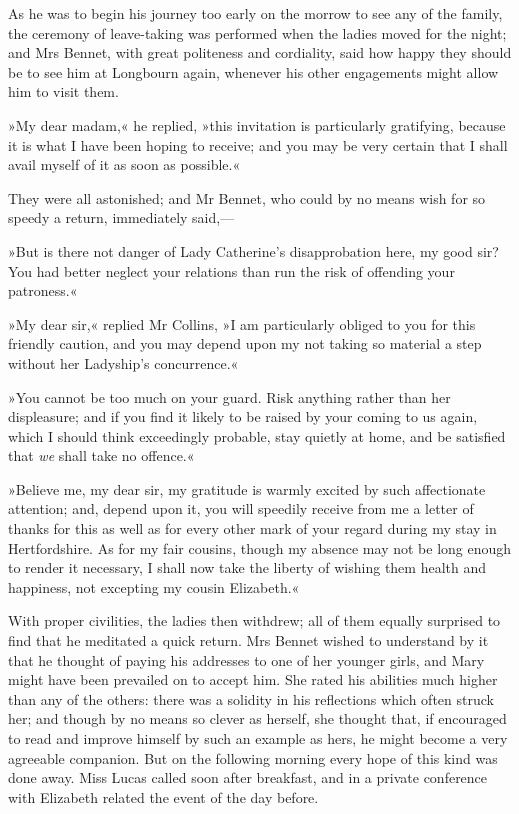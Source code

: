 As he was to begin his journey too early on the morrow to see any of the family, the ceremony of leave-taking was performed when the ladies moved for the night; and Mrs Bennet, with great politeness and cordiality, said how happy they should be to see him at Longbourn again, whenever his other engagements might allow him to visit them.

»My dear madam,« he replied, »this invitation is particularly gratifying, because it is what I have been hoping to receive; and you may be very certain that I shall avail myself of it as soon as possible.«

They were all astonished; and Mr Bennet, who could by no means wish for so speedy a return, immediately said,—

»But is there not danger of Lady Catherine's disapprobation here, my good sir? You had better neglect your relations than run the risk of offending your patroness.«

»My dear sir,« replied Mr Collins, »I am particularly obliged to you for this friendly caution, and you may depend upon my not taking so material a step without her Ladyship's concurrence.«

»You cannot be too much on your guard. Risk anything rather than her displeasure; and if you find it likely to be raised by your coming to us again, which I should think exceedingly probable, stay quietly at home, and be satisfied that \textit{we} shall take no offence.«

»Believe me, my dear sir, my gratitude is warmly excited by such affectionate attention; and, depend upon it, you will speedily receive from me a letter of thanks for this as well as for every other mark of your regard during my stay in Hertfordshire. As for my fair cousins, though my absence may not be long enough to render it necessary, I shall now take the liberty of wishing them health and happiness, not excepting my cousin Elizabeth.«

With proper civilities, the ladies then withdrew; all of them equally surprised to find that he meditated a quick return. Mrs Bennet wished to understand by it that he thought of paying his addresses to one of her younger girls, and Mary might have been prevailed on to accept him. She rated his abilities much higher than any of the others: there was a solidity in his reflections which often struck her; and though by no means so clever as herself, she thought that, if encouraged to read and improve himself by such an example as hers, he might become a very agreeable companion. But on the following morning every hope of this kind was done away. Miss Lucas called soon after breakfast, and in a private conference with Elizabeth related the event of the day before.

